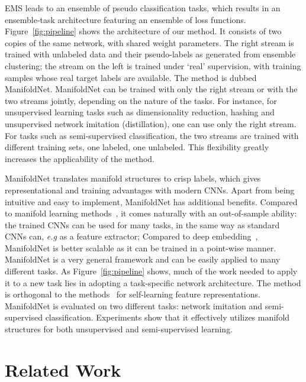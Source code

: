 \documentclass{bmvc2k}
\def\eg{\emph{e.g}\bmvaOneDot}
\begin{document}
EMS leads to an ensemble of pseudo classification tasks, which results
in an ensemble-task architecture featuring an ensemble of loss
functions.  Figure~\ref{fig:pipeline} shows the architecture
of our method. It consists of two copies of the same network, with 
shared weight parameters. The right stream is trained with 
unlabeled data and their pseudo-labels as generated from ensemble clustering; the stream on the left is trained under `real' supervision, 
with training samples whose real target labels are available. The method is dubbed ManifoldNet. 
ManifoldNet can be trained with only the right stream or with the two 
streams jointly, depending on the nature of the tasks. 
For instance, for unsupervised learning tasks such as dimensionality reduction, hashing and unsupervised network imitation (distillation), one can use only the right stream. 
For tasks such as semi-supervised classification, the two streams are trained with different training sets,  one labeled, one unlabeled. This flexibility greatly increases the applicability of the method.



ManifoldNet translates manifold structures to crisp labels, which gives
representational and training advantages with modern CNNs. Apart from
being intuitive and easy to implement, ManifoldNet has additional
benefits. Compared to manifold learning methods~\cite{lle:science:00,dai:metric:imitation,isomap},  it comes naturally with an out-of-sample ability: the trained CNNs 
can be used for many tasks, in the same way as standard CNNs can, \eg 
as a feature extractor; 
Compared to deep embedding~\cite{Weston:2008,deep:kernel:reg:09, manifold:cnn:14, revisiting:semi_graph}, ManifoldNet is better scalable as it can be trained in a point-wise manner.  
ManifoldNet is a very general framework and can be easily applied to many different tasks.
As Figure~\ref{fig:pipeline} shows, much of the work needed to apply 
it to a new task lies in adopting a task-specific network 
architecture. The method is orthogonal to the  methods~\cite{doersch2015unsupervised,fl:video,DFB16} for self-learning feature representations.  
ManifoldNet is evaluated on two different tasks: network imitation and semi-supervised
classification. Experiments show that it effectively utilizes manifold structures for both unsupervised and semi-supervised learning. 



\section{Related Work}
\label{sec:related}
\end{document}
